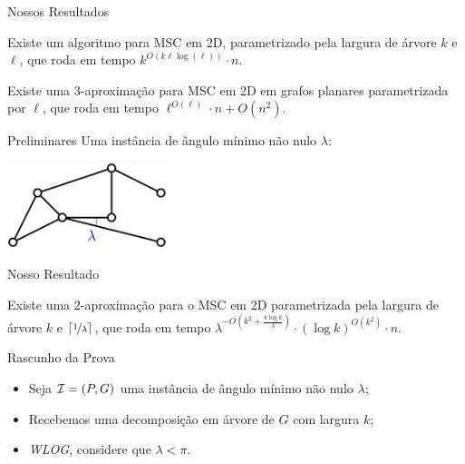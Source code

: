 \begin{frame}{Nossos Resultados}
  \begin{thm}
    Existe um algoritmo \FPT para MSC em 2D, parametrizado pela largura de árvore $k$ e $\ell$, que roda em tempo $k^{O(k \ell \log(\ell))} \cdot n$.
  \end{thm}

  \pause
  \begin{cor}
    Existe uma $3$-aproximação para MSC em 2D em grafos planares parametrizada por $\ell$, que roda em tempo $\ell^{O(\ell)} \cdot n + O(n^2)$.
  \end{cor}
\end{frame}

\begin{frame}{Preliminares}
  \centering
  Uma instância de ângulo mínimo não nulo $\lambda$:

  \bigskip
  \begin{minipage}{\linewidth}
    \centering
    \includegraphics[height=2.5cm]{MSC/lambda.png}
  \end{minipage}
\end{frame}

\begin{frame}{Nosso Resultado}
  \begin{thm}
    Existe uma $2$-aproximação para o MSC em 2D parametrizada pela largura de árvore $k$ e $\lceil \nicefrac{1}{\lambda} \rceil$, que roda em tempo $\lambda^{-O(k^2 + \frac{k \log k}{\lambda})} \cdot (\log k)^{O(k^2)} \cdot n$.
  \end{thm}
\end{frame}

\begin{frame}{Rascunho da Prova}
    \begin{itemize}[<+->]
        \item Seja $\mathcal{I} = (P, G)$ uma instância de ângulo mínimo não nulo $\lambda$;

        \item Recebemos uma decomposição em árvore de $G$ com largura $k$;

        \item \emph{WLOG}, considere que $\lambda < \pi$.
    \end{itemize}
\end{frame}

